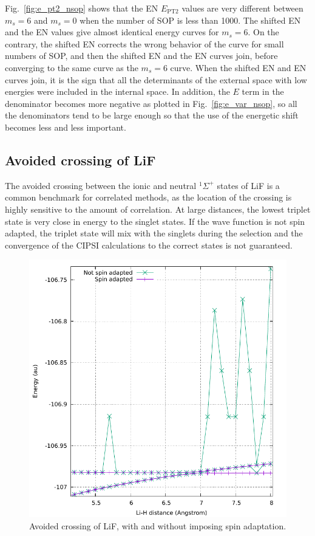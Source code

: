 \documentclass[aip,jcp,reprint,showkeys]{revtex4-1}
\newcommand{\sop}{SOP}
\newcommand{\cipsi}{CIPSI}
\newcommand{\ept}{E_\text{PT2}}
\begin{document}
Fig.~\ref{fig:e_pt2_nsop} shows that the EN $\ept$ values are very different
between $m_s=6$ and $m_s=0$ when the number of \sop{} is less than 1000. The
shifted EN and the EN values give almost identical energy curves for $m_s=6$.
On the contrary, the shifted EN
corrects the wrong behavior of the curve for small numbers of \sop{}, and then
the shifted EN and the EN curves join, before converging to the same curve as
the $m_s=6$ curve. When the shifted EN and EN curves join, it is the sign
that all the determinants of the external space with low energies were included
in the internal space. In addition, the $E$ term in the denominator becomes more
negative as plotted in Fig.~\ref{fig:e_var_nsop}, so all the denominators tend to be large enough so that the use of the energetic shift becomes less and
less important.


\subsection{Avoided crossing of LiF}

The avoided crossing between the ionic and neutral $^1\Sigma^+$ states of LiF is a 
common benchmark for correlated methods, as the location of the crossing is highly
sensitive to the amount of correlation. At large distances, the lowest triplet state
is very close in energy to the singlet states. If the wave function is not
spin adapted, the triplet state will mix with the singlets during the selection
and the convergence of the \cipsi{} calculations to the correct states is not guaranteed.

\begin{figure}
\includegraphics[width=0.9\columnwidth]{lif}
\caption{Avoided crossing of LiF, with and without imposing spin adaptation.}
\label{fig:lif}
\end{figure}
\end{document}
